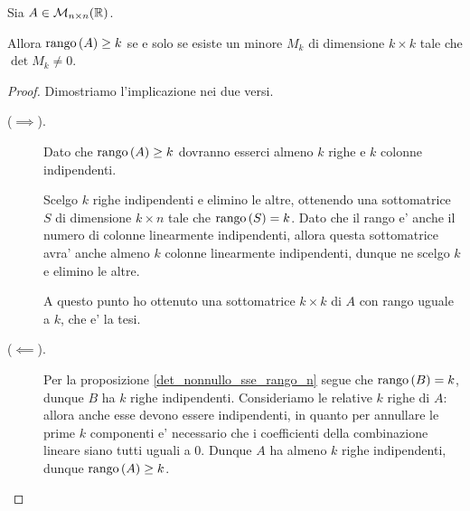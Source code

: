 \begin{proposition}\label{rango_geq_k_sse_det_minore_k_neq_0}
    Sia $A \in \mathcal{M}_{n \times n}(\mathbb{R})$.
    
    Allora $\operatorname{rango}\left( A \right) \geq k$ se e solo se esiste un minore $M_k$ di dimensione $k \times k$ tale che $\det M_k \neq 0$.
\end{proposition}
\begin{proof} Dimostriamo l'implicazione nei due versi.
    \begin{description}
        \item[($\implies$).] Dato che $\operatorname{rango}\left( A \right) \geq k$ dovranno esserci almeno $k$ righe e $k$ colonne indipendenti. 
        
        Scelgo $k$ righe indipendenti e elimino le altre, ottenendo una sottomatrice $S$ di dimensione $k \times n$ tale che $\operatorname{rango}\left( S \right) = k$. Dato che il rango e' anche il numero di colonne linearmente indipendenti, allora questa sottomatrice avra' anche almeno $k$ colonne linearmente indipendenti, dunque ne scelgo $k$ e elimino le altre.

        A questo punto ho ottenuto una sottomatrice $k \times k$ di $A$ con rango uguale a $k$, che e' la tesi.
        \item[($\impliedby$).] Per la proposizione \ref{det_nonnullo_sse_rango_n} segue che $\operatorname{rango}\left( B \right) = k$, dunque $B$ ha $k$ righe indipendenti. Consideriamo le relative $k$ righe di $A$: allora anche esse devono essere indipendenti, in quanto per annullare le prime $k$ componenti e' necessario che i coefficienti della combinazione lineare siano tutti uguali a $0$. Dunque $A$ ha almeno $k$ righe indipendenti, dunque $\operatorname{rango}\left( A \right) \geq k$. \qedhere
    \end{description}
\end{proof}

